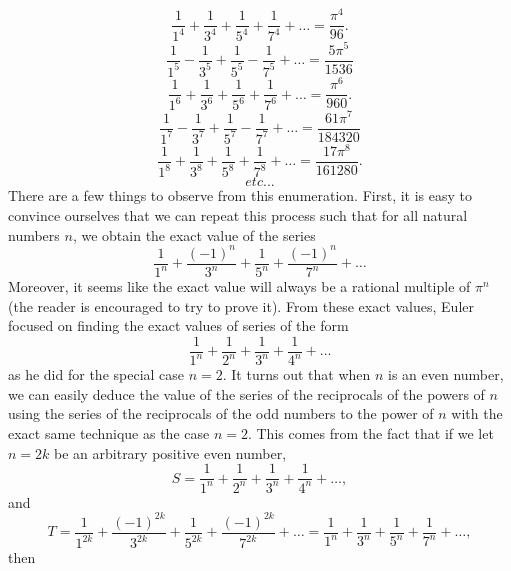 \begin{equation}\label{zeta-4 but only odd numbers}
    \frac{1}{1^4} + \frac{1}{3^4} + \frac{1}{5^4} + \frac{1}{7^4} + \dots = \frac{\pi^4}{96}.
\end{equation}
\begin{equation} \label{closely zeta-5}
    \frac{1}{1^5} - \frac{1}{3^5} + \frac{1}{5^5} - \frac{1}{7^5} + \dots = \frac{5\pi^5}{1536}
\end{equation}
\begin{equation}\label{zeta-6 but only odd numbers}
    \frac{1}{1^6} + \frac{1}{3^6} + \frac{1}{5^6} + \frac{1}{7^6} + \dots = \frac{\pi^6}{960}.
\end{equation}
\begin{equation} \label{closely zeta-7}
    \frac{1}{1^7} - \frac{1}{3^7} + \frac{1}{5^7} - \frac{1}{7^7} + \dots = \frac{61\pi^7}{184320}
\end{equation}
\begin{equation}\label{zeta-8 but only odd numbers}
    \frac{1}{1^8} + \frac{1}{3^8} + \frac{1}{5^8} + \frac{1}{7^8} + \dots = \frac{17\pi^8}{161280}.
\end{equation}
$$etc ...$$
There are a few things to observe from this enumeration. First, it is easy to convince ourselves that we can repeat this process such that for all natural numbers $n$, we obtain the exact value of the series
\begin{equation} \label{series found by euler}
    \frac{1}{1^n} + \frac{(-1)^n}{3^n} + \frac{1}{5^n} + \frac{(-1)^n}{7^n} + \dots
\end{equation}
Moreover, it seems like the exact value will always be a rational multiple of $\pi^n$ (the reader is encouraged to try to prove it). From these exact values, Euler focused on finding the exact values of series of the form
$$\frac{1}{1^n} + \frac{1}{2^n} + \frac{1}{3^n} + \frac{1}{4^n} + \dots$$
as he did for the special case $n=2$. It turns out that when $n$ is an even number, we can easily deduce the value of the series of the reciprocals of the powers of $n$ using the series of the reciprocals of the odd numbers to the power of $n$ with the exact same technique as the case $n=2$. This comes from the fact that if we let $n = 2k$ be an arbitrary positive even number, 
$$S = \frac{1}{1^{n}} + \frac{1}{2^{n}} + \frac{1}{3^{n}} + \frac{1}{4^{n}} + \dots,$$
and 
$$T = \frac{1}{1^{2k}} + \frac{(-1)^{2k}}{3^{2k}} + \frac{1}{5^{2k}} + \frac{(-1)^{2k}}{7^{2k}} + \dots = \frac{1}{1^{n}} + \frac{1}{3^{n}} + \frac{1}{5^{n}} + \frac{1}{7^{n}} + \dots,$$
then 
